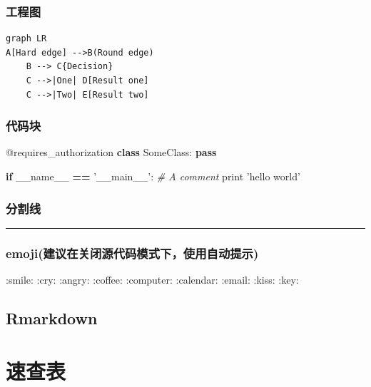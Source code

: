\documentclass[]{book}
\newenvironment{Shaded}{\begin{snugshade}}{\end{snugshade}}
\newcommand{\AttributeTok}[1]{\textcolor[rgb]{0.77,0.63,0.00}{#1}}
\newcommand{\BuiltInTok}[1]{#1}
\newcommand{\CommentTok}[1]{\textcolor[rgb]{0.56,0.35,0.01}{\textit{#1}}}
\newcommand{\ControlFlowTok}[1]{\textcolor[rgb]{0.13,0.29,0.53}{\textbf{#1}}}
\newcommand{\KeywordTok}[1]{\textcolor[rgb]{0.13,0.29,0.53}{\textbf{#1}}}
\newcommand{\NormalTok}[1]{#1}
\newcommand{\OperatorTok}[1]{\textcolor[rgb]{0.81,0.36,0.00}{\textbf{#1}}}
\newcommand{\StringTok}[1]{\textcolor[rgb]{0.31,0.60,0.02}{#1}}
\newcommand{\VariableTok}[1]{\textcolor[rgb]{0.00,0.00,0.00}{#1}}
\begin{document}
\hypertarget{section-45}{%
\subsection{工程图}\label{section-45}}

\begin{verbatim}
graph LR
A[Hard edge] -->B(Round edge)
    B --> C{Decision}
    C -->|One| D[Result one]
    C -->|Two| E[Result two]
\end{verbatim}

\hypertarget{section-46}{%
\subsection{代码块}\label{section-46}}

\begin{Shaded}
\begin{Highlighting}[]
\AttributeTok{@requires_authorization}
\KeywordTok{class}\NormalTok{ SomeClass:}
    \ControlFlowTok{pass}

\ControlFlowTok{if} \VariableTok{__name__} \OperatorTok{==} \StringTok{'__main__'}\NormalTok{:}
    \CommentTok{# A comment}
    \BuiltInTok{print} \StringTok{'hello world'}
\end{Highlighting}
\end{Shaded}

\hypertarget{section-47}{%
\subsection{分割线}\label{section-47}}

\begin{center}\rule{0.5\linewidth}{\linethickness}\end{center}

\hypertarget{emoji}{%
\subsection{emoji(建议在关闭源代码模式下，使用自动提示)}\label{emoji}}

:smile:
:cry:
:angry:
:coffee:
:computer:
:calendar:
:email:
:kiss:
:key:

\hypertarget{rmarkdown}{%
\section{Rmarkdown}\label{rmarkdown}}

\hypertarget{section-48}{%
\chapter{速查表}\label{section-48}}
\end{document}
